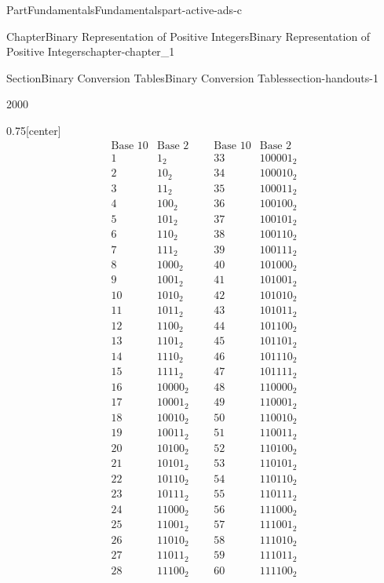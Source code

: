 \documentclass[oneside,10pt,]{book}
\numberwithin{equation}{section}
\begin{document}
\begin{partptx}{Part}{Fundamentals}{}{Fundamentals}{}{}{part-active-ads-c}
\begin{chapterptx}{Chapter}{Binary Representation of Positive Integers}{}{Binary Representation of Positive Integers}{}{}{chapter-chapter_1}
\begin{sectionptx}{Section}{Binary Conversion Tables}{}{Binary Conversion Tables}{}{}{section-handouts-1}
\begin{sidebyside}{2}{0}{0}{0}
\begin{sbspanel}{0.75}[center]
%
\begin{equation*}
\begin{array}{ccccc}
\text{Base 10} & \text{Base
2} & \text{} & \text{Base
10} & \text{Base 2} \\
1 & 1_2 & \text{     } & 33 &
100001_2 \\
2 & 10_2 & \text{     } & 34
& 100010_2 \\
3 & 11_2 & \text{     } & 35
& 100011_2 \\
4 & 100_2 & \text{     } & 36
& 100100_2 \\
5 & 101_2 & \text{     } & 37
& 100101_2 \\
6 & 110_2 & \text{     } & 38
& 100110_2 \\
7 & 111_2 & \text{     } & 39
& 100111_2 \\
8 & 1000_2 & \text{     } &
40 & 101000_2 \\
9 & 1001_2 & \text{     } &
41 & 101001_2 \\
10 & 1010_2 & \text{     } &
42 & 101010_2 \\
11 & 1011_2 & \text{     } &
43 & 101011_2 \\
12 & 1100_2 & \text{     } &
44 & 101100_2 \\
13 & 1101_2 & \text{     } &
45 & 101101_2 \\
14 & 1110_2 & \text{     } &
46 & 101110_2 \\
15 & 1111_2 & \text{     } &
47 & 101111_2 \\
16 & 10000_2 & \text{     } &
48 & 110000_2 \\
17 & 10001_2 & \text{     } &
49 & 110001_2 \\
18 & 10010_2 & \text{     } &
50 & 110010_2 \\
19 & 10011_2 & \text{     } &
51 & 110011_2 \\
20 & 10100_2 & \text{     } &
52 & 110100_2 \\
21 & 10101_2 & \text{     } &
53 & 110101_2 \\
22 & 10110_2 & \text{     } &
54 & 110110_2 \\
23 & 10111_2 & \text{     } &
55 & 110111_2 \\
24 & 11000_2 & \text{     } &
56 & 111000_2 \\
25 & 11001_2 & \text{     } &
57 & 111001_2 \\
26 & 11010_2 & \text{     } &
58 & 111010_2 \\
27 & 11011_2 & \text{     } &
59 & 111011_2 \\
28 & 11100_2 & \text{     } &
60 & 111100_2 \\

\end{array}
\end{equation*}
\end{sbspanel}
\end{sidebyside}
\end{sectionptx}
\end{chapterptx}
\end{partptx}
\end{document}
